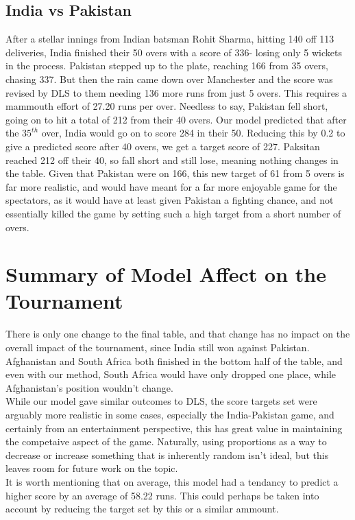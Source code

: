 \subsection{India vs Pakistan}
After a stellar innings from Indian batsman Rohit Sharma, hitting 140 off 113 deliveries, India finished their 50 overs with a score of 336- losing only 5 wickets in the process. Pakistan stepped up to the plate, reaching 
166 from 35 overs, chasing 337. But then the rain came down over Manchester and the score was revised by DLS to them needing 136 more runs from just 5 overs. This requires a mammouth effort of 27.20 runs per over. Needless to say,
Pakistan fell short, going on to hit a total of 212 from their 40 overs. Our model predicted that after the $35^{th}$ over, India would go on to score 284 in their 50. Reducing this by 0.2 to give a predicted score after 40 overs, 
we get a target score of 227. Paksitan reached 212 off their 40, so fall short and still lose, meaning nothing changes in the table. Given that Pakistan were on 166, this new target of 61 from 5 overs is far more realistic, and would have 
meant for a far more enjoyable game for the spectators, as it would have at least given Pakistan a fighting chance, and not essentially killed the game by setting such a high target from a short number 
of overs. 

\section{Summary of Model Affect on the Tournament}
There is only one change to the final table, and that change has no impact on the overall impact of the tournament, since India still won against Pakistan. Afghanistan and South Africa both finished in the bottom 
half of the table, and even with our method, South Africa would have only dropped one place, while Afghanistan's position wouldn't change. \\

While our model gave similar outcomes to DLS, the score targets set were arguably more realistic in some cases, especially the India-Pakistan game, and certainly from an entertainment perspective, this 
has great value in maintaining the competaive aspect of the game. Naturally, using proportions as a way to decrease or increase something that is inherently random isn't ideal, but this leaves room for future work 
on the topic.  \\

It is worth mentioning that on average, this model had a tendancy to predict a higher score by an average of 58.22 runs. This could perhaps be taken into account by reducing the target set by this or a similar 
ammount. 
